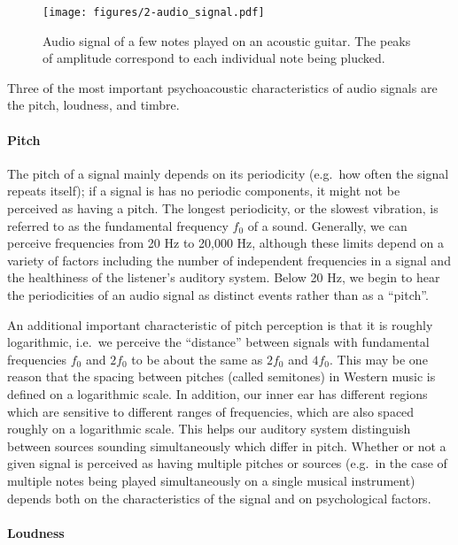 \begin{figure}
  \centering
  \texttt{[image: figures/2-audio\_signal.pdf]}
  \caption[Audio recording of an acoustic guitar]{Audio signal of a few notes played on an acoustic guitar.
  The peaks of amplitude correspond to each individual note being plucked.}
  \label{fig:audio_signal}
\end{figure}

Three of the most important psychoacoustic characteristics of audio signals are the pitch, loudness, and timbre.

\paragraph{Pitch}

The pitch of a signal mainly depends on its periodicity (e.g.\ how often the signal repeats itself); if a signal is has no periodic components, it might not be perceived as having a pitch.
The longest periodicity, or the slowest vibration, is referred to as the fundamental frequency $f_0$ of a sound.
Generally, we can perceive frequencies from 20 Hz to 20,000 Hz, although these limits depend on a variety of factors including the number of independent frequencies in a signal and the healthiness of the listener's auditory system.
Below 20 Hz, we begin to hear the periodicities of an audio signal as distinct events rather than as a ``pitch''.

An additional important characteristic of pitch perception is that it is roughly logarithmic, i.e.\ we perceive the ``distance'' between signals with fundamental frequencies $f_0$ and $2f_0$ to be about the same as $2f_0$ and $4f_0$.
This may be one reason that the spacing between pitches (called semitones) in Western music is defined on a logarithmic scale.
In addition, our inner ear has different regions which are sensitive to different ranges of frequencies, which are also spaced roughly on a logarithmic scale.
This helps our auditory system distinguish between sources sounding simultaneously which differ in pitch.
Whether or not a given signal is perceived as having multiple pitches or sources (e.g.\ in the case of multiple notes being played simultaneously on a single musical instrument) depends both on the characteristics of the signal and on psychological factors.

\paragraph{Loudness}

